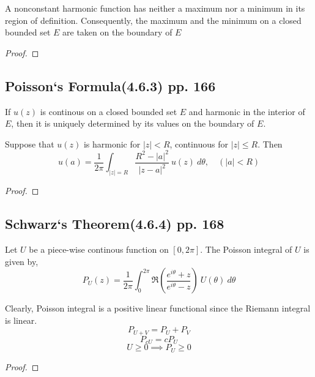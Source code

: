 \begin{theorem}
	A nonconstant harmonic function has neither a maximum nor a minimum in its region of definition. Consequently, the maximum and the minimum on a closed bounded set $E$ are taken on the boundary of $E$
\end{theorem}
\begin{proof}
\end{proof}

\subsection{Poisson`s Formula(4.6.3) pp. 166}
\begin{remark}
	If $u(z)$ is continous on a closed bounded set $E$ and harmonic in the interior of $E$, then it is uniquely determined by its values on the boundary of $E$.
\end{remark}
\begin{theorem}
	Suppose that $u(z)$ is harmonic for $|z| < R$, continuous for $|z| \le R$. Then
	\begin{equation}
		u(a) = \frac{1}{2\pi} \int_{|z|=R} \frac{R^2-|a|^2}{|z-a|^2}\ u(z)\ d\theta, \quad (|a| < R)
	\end{equation}
\end{theorem}
\begin{proof}
\end{proof}

\subsection{Schwarz`s Theorem(4.6.4) pp. 168}
\begin{definition}
	Let $U$ be a piece-wise continous function on $[0,2\pi]$.
	The Poisson integral of $U$ is given by,
	\begin{equation}
		P_U(z) = \frac{1}{2\pi} \int_0^{2\pi} \Re\left(\frac{e^{i\theta}+z}{e^{i\theta}-z}\right)\ U(\theta)\ d\theta
	\end{equation}
\end{definition}

\begin{remark} Clearly, Poisson integral is a positive linear functional since the Riemann integral is linear.
	\[ P_{U+V} = P_U + P_V \]
	\[ P_{cU} = cP_U \]
	\[ U \ge 0 \implies P_U \ge 0 \]
\end{remark}
\begin{proof}
\end{proof}

